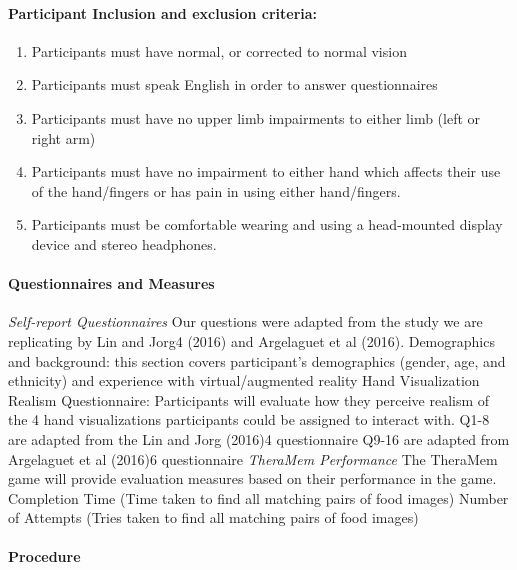 \paragraph{Participant Inclusion and exclusion criteria: }
\begin{enumerate}
	\item Participants must have normal, or corrected to normal vision
	\item Participants must speak English in order to answer questionnaires 
	\item Participants must have no upper limb impairments to either limb (left or right arm)
	\item Participants must have no impairment to either hand which affects their use of the hand/fingers or has pain in using either hand/fingers.
	\item Participants must be comfortable wearing and using a head-mounted display device and stereo headphones. 
\end{enumerate}

\paragraph{Questionnaires and Measures} \mbox{} \newline \newline
\textit{Self-report Questionnaires} \newline
 Our questions were adapted from the study we are replicating by Lin and Jorg4 (2016) and Argelaguet et al (2016).
Demographics and background: this section covers participant’s demographics (gender, age, and ethnicity) and experience with virtual/augmented reality
Hand Visualization Realism Questionnaire: Participants will evaluate how they perceive realism of the 4 hand visualizations participants could be assigned to interact with.
Q1-8 are adapted from the Lin and Jorg (2016)4 questionnaire 
Q9-16 are adapted from Argelaguet et al (2016)6 questionnaire \newline \newline
\textit{TheraMem Performance} \newline
The TheraMem game will provide evaluation measures based on their performance in the game.
Completion Time (Time taken to find all matching pairs of food images)
Number of Attempts (Tries taken to find all matching pairs of food images)


\paragraph{Procedure}

